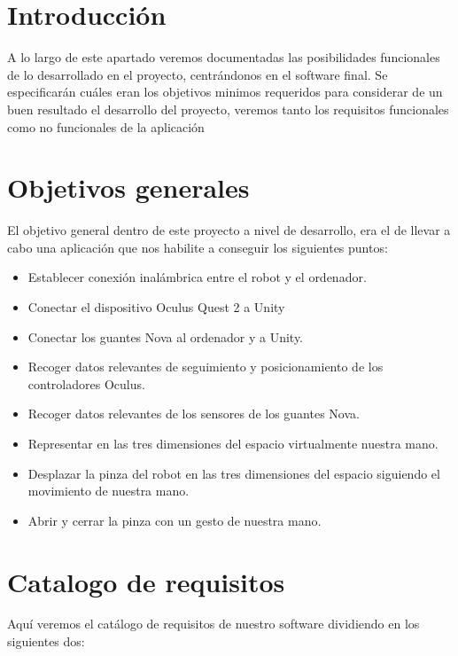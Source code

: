 
\section{Introducción}
A lo largo de este apartado veremos documentadas las posibilidades funcionales de lo desarrollado en el proyecto, centrándonos en el software final. Se especificarán cuáles eran los objetivos minimos requeridos para considerar de un buen resultado el desarrollo del proyecto, veremos tanto los requisitos funcionales como no funcionales de la aplicación
\section{Objetivos generales}
El objetivo general dentro de este proyecto a nivel de desarrollo, era el de llevar a cabo una aplicación que nos habilite a conseguir los siguientes puntos:
\begin{itemize}
    \item Establecer conexión inalámbrica entre el robot y el ordenador.
    \item Conectar el dispositivo Oculus Quest 2 a Unity\cite{Unity}
    \item Conectar los guantes Nova al ordenador y a Unity.
    \item Recoger datos relevantes de seguimiento y posicionamiento de los controladores Oculus.
    \item Recoger datos relevantes de los sensores de los guantes Nova.
    \item Representar en las tres dimensiones del espacio virtualmente nuestra mano.
    \item Desplazar la pinza del robot en las tres dimensiones del espacio siguiendo el movimiento de nuestra mano.
    \item Abrir y cerrar la pinza con un gesto de nuestra mano.
\end{itemize}
\section{Catalogo de requisitos}
Aquí veremos el catálogo de requisitos de nuestro software dividiendo en los siguientes dos:
